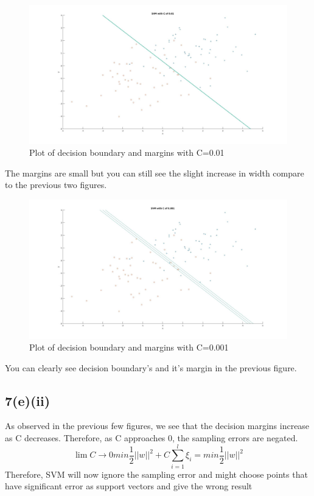 \begin{figure}[H]
\centering
\includegraphics[width=6.5in]{figures/q7-5-1.jpg}
\caption{Plot of decision boundary and margins with C=0.01}
\end{figure}
The margins are small but you can still see the slight increase in width compare to the previous two figures.
\begin{figure}[H]
\centering
\includegraphics[width=6.5in]{figures/q7-5-4.jpg}
\caption{Plot of decision boundary and margins with C=0.001}
\end{figure}
You can clearly see decision boundary's and it's margin in the previous figure.

\subsection*{7(e)(ii)}
As observed in the previous few figures, we see that the decision margins increase as C decreases. Therefore, as C approaches $0$, the sampling errors are negated.
\begin{equation}
\lim{C \to 0} min \frac{1}{2}||w||^2 + C\sum_{i=1}^l\xi_i = min \frac{1}{2}||w||^2
\end{equation}
Therefore, SVM will now ignore the sampling error and might choose points that have significant error as support vectors and give the wrong result 


